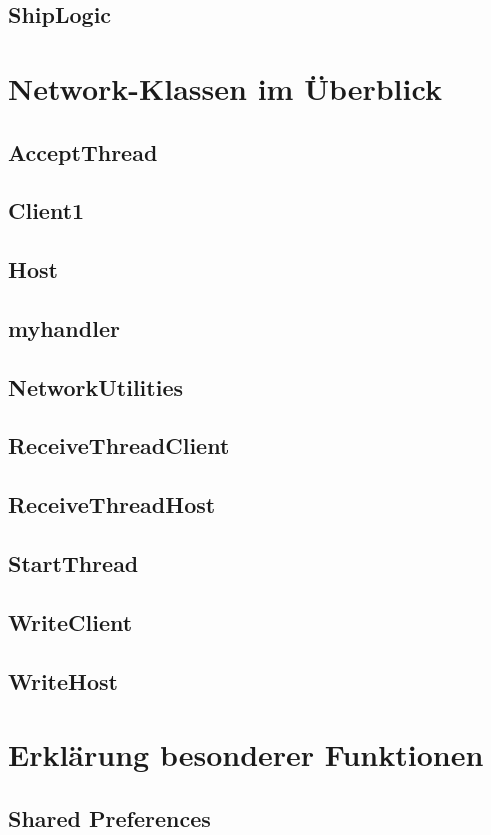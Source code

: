 \documentclass[11pt]{article} %
\begin{document}
\subsection{ShipLogic}

\section{Network-Klassen im Überblick}

\subsection{AcceptThread}

\subsection{Client1}

\subsection{Host}

\subsection{myhandler}

\subsection{NetworkUtilities}

\subsection{ReceiveThreadClient}

\subsection{ReceiveThreadHost}

\subsection{StartThread}

\subsection{WriteClient}

\subsection{WriteHost}

\section{Erklärung besonderer Funktionen}

\subsection{Shared Preferences}
\end{document}
